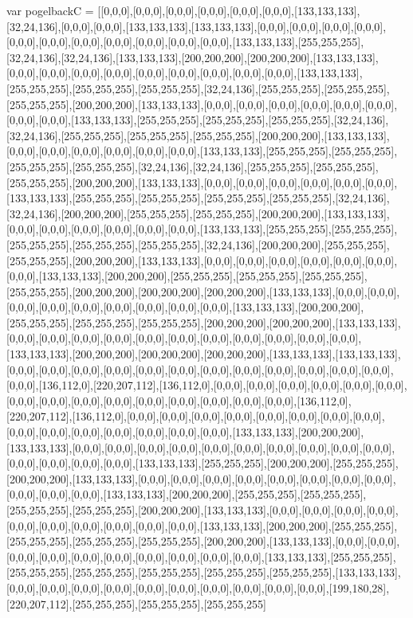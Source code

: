 var pogelbackC = [[0,0,0],[0,0,0],[0,0,0],[0,0,0],[0,0,0],[0,0,0],[133,133,133],[32,24,136],[0,0,0],[0,0,0],[133,133,133],[133,133,133],[0,0,0],[0,0,0],[0,0,0],[0,0,0],[0,0,0],[0,0,0],[0,0,0],[0,0,0],[0,0,0],[0,0,0],[0,0,0],[133,133,133],[255,255,255],[32,24,136],[32,24,136],[133,133,133],[200,200,200],[200,200,200],[133,133,133],[0,0,0],[0,0,0],[0,0,0],[0,0,0],[0,0,0],[0,0,0],[0,0,0],[0,0,0],[0,0,0],[133,133,133],[255,255,255],[255,255,255],[255,255,255],[32,24,136],[255,255,255],[255,255,255],[255,255,255],[200,200,200],[133,133,133],[0,0,0],[0,0,0],[0,0,0],[0,0,0],[0,0,0],[0,0,0],[0,0,0],[0,0,0],[133,133,133],[255,255,255],[255,255,255],[255,255,255],[32,24,136],[32,24,136],[255,255,255],[255,255,255],[255,255,255],[200,200,200],[133,133,133],[0,0,0],[0,0,0],[0,0,0],[0,0,0],[0,0,0],[0,0,0],[133,133,133],[255,255,255],[255,255,255],[255,255,255],[255,255,255],[32,24,136],[32,24,136],[255,255,255],[255,255,255],[255,255,255],[200,200,200],[133,133,133],[0,0,0],[0,0,0],[0,0,0],[0,0,0],[0,0,0],[0,0,0],[133,133,133],[255,255,255],[255,255,255],[255,255,255],[255,255,255],[32,24,136],[32,24,136],[200,200,200],[255,255,255],[255,255,255],[200,200,200],[133,133,133],[0,0,0],[0,0,0],[0,0,0],[0,0,0],[0,0,0],[0,0,0],[133,133,133],[255,255,255],[255,255,255],[255,255,255],[255,255,255],[255,255,255],[32,24,136],[200,200,200],[255,255,255],[255,255,255],[200,200,200],[133,133,133],[0,0,0],[0,0,0],[0,0,0],[0,0,0],[0,0,0],[0,0,0],[0,0,0],[133,133,133],[200,200,200],[255,255,255],[255,255,255],[255,255,255],[255,255,255],[200,200,200],[200,200,200],[200,200,200],[133,133,133],[0,0,0],[0,0,0],[0,0,0],[0,0,0],[0,0,0],[0,0,0],[0,0,0],[0,0,0],[0,0,0],[133,133,133],[200,200,200],[255,255,255],[255,255,255],[255,255,255],[200,200,200],[200,200,200],[133,133,133],[0,0,0],[0,0,0],[0,0,0],[0,0,0],[0,0,0],[0,0,0],[0,0,0],[0,0,0],[0,0,0],[0,0,0],[0,0,0],[133,133,133],[200,200,200],[200,200,200],[200,200,200],[133,133,133],[133,133,133],[0,0,0],[0,0,0],[0,0,0],[0,0,0],[0,0,0],[0,0,0],[0,0,0],[0,0,0],[0,0,0],[0,0,0],[0,0,0],[0,0,0],[0,0,0],[136,112,0],[220,207,112],[136,112,0],[0,0,0],[0,0,0],[0,0,0],[0,0,0],[0,0,0],[0,0,0],[0,0,0],[0,0,0],[0,0,0],[0,0,0],[0,0,0],[0,0,0],[0,0,0],[0,0,0],[0,0,0],[136,112,0],[220,207,112],[136,112,0],[0,0,0],[0,0,0],[0,0,0],[0,0,0],[0,0,0],[0,0,0],[0,0,0],[0,0,0],[0,0,0],[0,0,0],[0,0,0],[0,0,0],[0,0,0],[0,0,0],[0,0,0],[133,133,133],[200,200,200],[133,133,133],[0,0,0],[0,0,0],[0,0,0],[0,0,0],[0,0,0],[0,0,0],[0,0,0],[0,0,0],[0,0,0],[0,0,0],[0,0,0],[0,0,0],[0,0,0],[0,0,0],[133,133,133],[255,255,255],[200,200,200],[255,255,255],[200,200,200],[133,133,133],[0,0,0],[0,0,0],[0,0,0],[0,0,0],[0,0,0],[0,0,0],[0,0,0],[0,0,0],[0,0,0],[0,0,0],[0,0,0],[133,133,133],[200,200,200],[255,255,255],[255,255,255],[255,255,255],[255,255,255],[200,200,200],[133,133,133],[0,0,0],[0,0,0],[0,0,0],[0,0,0],[0,0,0],[0,0,0],[0,0,0],[0,0,0],[0,0,0],[0,0,0],[133,133,133],[200,200,200],[255,255,255],[255,255,255],[255,255,255],[255,255,255],[200,200,200],[133,133,133],[0,0,0],[0,0,0],[0,0,0],[0,0,0],[0,0,0],[0,0,0],[0,0,0],[0,0,0],[0,0,0],[0,0,0],[133,133,133],[255,255,255],[255,255,255],[255,255,255],[255,255,255],[255,255,255],[255,255,255],[133,133,133],[0,0,0],[0,0,0],[0,0,0],[0,0,0],[0,0,0],[0,0,0],[0,0,0],[0,0,0],[0,0,0],[0,0,0],[199,180,28],[220,207,112],[255,255,255],[255,255,255],[255,255,255]